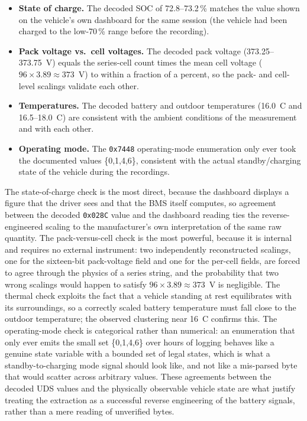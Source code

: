 \documentclass[11pt,a4paper,oneside,parskip=half]{scrreprt}
\providecommand{\hex}{}\renewcommand{\hex}[1]{\texttt{0x#1}}
\begin{document}
\begin{itemize}
  \item \textbf{State of charge.} The decoded SOC of 72.8--73.2\,\% matches the value shown on the vehicle's own dashboard for the same session (the vehicle had been charged to the low-70\,\% range before the recording).
  \item \textbf{Pack voltage vs.\ cell voltages.} The decoded pack voltage (373.25--373.75~V) equals the series-cell count times the mean cell voltage ($96\times3.89\approx373$~V) to within a fraction of a percent, so the pack- and cell-level scalings validate each other.
  \item \textbf{Temperatures.} The decoded battery and outdoor temperatures (16.0~\textdegree C and 16.5--18.0~\textdegree C) are consistent with the ambient conditions of the measurement and with each other.
  \item \textbf{Operating mode.} The \hex{7448} operating-mode enumeration only ever took the documented values \{0,1,4,6\}, consistent with the actual standby/charging state of the vehicle during the recordings.
\end{itemize}

The state-of-charge check is the most direct, because the dashboard displays a figure that the driver sees and that the BMS itself computes, so agreement between the decoded \hex{028C} value and the dashboard reading ties the reverse-engineered scaling to the manufacturer's own interpretation of the same raw quantity. The pack-versus-cell check is the most powerful, because it is internal and requires no external instrument: two independently reconstructed scalings, one for the sixteen-bit pack-voltage field and one for the per-cell fields, are forced to agree through the physics of a series string, and the probability that two wrong scalings would happen to satisfy $96\times3.89\approx373$~V is negligible. The thermal check exploits the fact that a vehicle standing at rest equilibrates with its surroundings, so a correctly scaled battery temperature must fall close to the outdoor temperature; the observed clustering near 16~\textdegree C confirms this. The operating-mode check is categorical rather than numerical: an enumeration that only ever emits the small set \{0,1,4,6\} over hours of logging behaves like a genuine state variable with a bounded set of legal states, which is what a standby-to-charging mode signal should look like, and not like a mis-parsed byte that would scatter across arbitrary values. These agreements between the decoded UDS values and the physically observable vehicle state are what justify treating the extraction as a successful reverse engineering of the battery signals, rather than a mere reading of unverified bytes.
\end{document}

